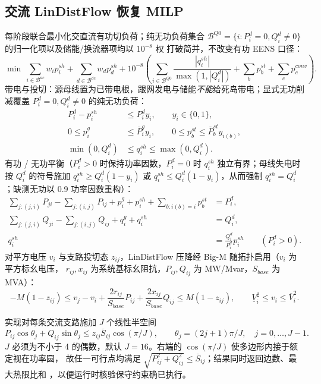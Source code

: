 \subsection{交流 LinDistFlow 恢复 MILP}\label{sec:rel-rs-milp}
每阶段联合最小化交直流有功切负荷；纯无功负荷集合
$\mathcal B^{Q0}=\{i:P_i^d=0,Q_i^d\ne0\}$ 的归一化项以及储能/换流器项均以 $10^{-8}$ 权
打破简并，不改变有功 EENS 口径：
\begin{equation}
 \min\ \sum_{i\in\mathcal B^{ac}}w_ip_i^{sh}+\sum_{d\in\mathcal B^{dc}}w_dp_d^{sh}
 +10^{-8}\left(\sum_{i\in\mathcal B^{Q0}}
 \frac{|q_i^{sh}|}{\max(1,|Q_i^d|)}+\sum_bp_b^{st}+\sum_cp_c^{conv}\right).
\end{equation}
带电与投切：源母线置为已带电根，跟网发电与储能\emph{不能}给死岛带电；显式无功削减覆盖
$P_i^d=0,Q_i^d\ne0$ 的纯无功负荷：
\begin{align}
 P_i^d-p_i^{sh}&\le P_i^dy_i,\qquad y_i\in\{0,1\},\\
 0\le p_i^g&\le\overline P_i^gy_i,\qquad
 0\le p_b^{st}\le\overline P_b^{st}y_{i(b)},\\
 \min(0,Q_i^d)&\le q_i^{sh}\le\max(0,Q_i^d).
\end{align}
有功 / 无功平衡（$P_i^d>0$ 时保持功率因数，$P_i^d=0$ 时 $q_i^{sh}$ 独立有界；母线失电时
按 $Q_i^d$ 的符号施加 $q_i^{sh}\ge Q_i^d(1-y_i)$ 或 $q_i^{sh}\le Q_i^d(1-y_i)$，从而强制
$q_i^{sh}=Q_i^d$；缺测无功以 0.9 功率因数重构）：
\begin{align}
 \sum_{j:(j,i)}P_{ji}-\sum_{j:(i,j)}P_{ij}+p_i^g+p_i^{sh}+\sum_{b:i(b)=i}p_b^{st}&=P_i^d,\\
 \sum_{j:(j,i)}Q_{ji}-\sum_{j:(i,j)}Q_{ij}+q_i^g+q_i^{sh}&=Q_i^d,\\
 q_i^{sh}&=\frac{Q_i^d}{P_i^d}p_i^{sh}\qquad(P_i^d>0).
\end{align}
对平方电压 $v_i$ 与支路投切态 $z_{ij}$，LinDistFlow 压降经 Big-M 随拓扑启用（$v_i$ 为平方标幺电压，
$r_{ij},x_{ij}$ 为系统基标幺阻抗，$P_{ij},Q_{ij}$ 为 MW/Mvar，$S_{base}$ 为 MVA）：
\begin{equation}
 -M(1-z_{ij})\le v_j-v_i+\frac{2r_{ij}}{S_{base}}P_{ij}+\frac{2x_{ij}}{S_{base}}Q_{ij}\le M(1-z_{ij}),
 \qquad \underline V_i^2\le v_i\le\overline V_i^2.
\end{equation}

\begin{remark}[视在功率内接多边形]\label{rem:rel-rs-box}
实现对每条交流支路施加 $J$ 个线性半空间
\begin{equation}
 P_{ij}\cos\theta_j+Q_{ij}\sin\theta_j
 \le z_{ij}\overline S_{ij}\cos(\pi/J),\qquad
 \theta_j=(2j+1)\pi/J,\quad j=0,\ldots,J-1.
\end{equation}
$J$ 必须为不小于 4 的偶数，默认 $J=16$。右端的 $\cos(\pi/J)$ 使多边形内接于额定视在功率圆，
故任一可行点均满足 $\sqrt{P_{ij}^2+Q_{ij}^2}\le\overline S_{ij}$；结果同时返回边数、最大热限比和
，以便运行时核验保守约束确已执行。
\end{remark}

